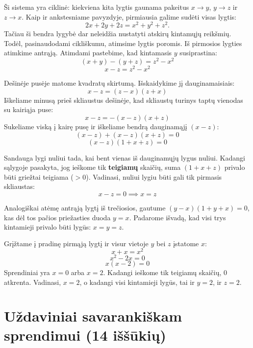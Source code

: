 \documentclass[11pt,a4paper]{scrartcl}
\begin{document}
\begin{solution}
Ši sistema yra ciklinė: kiekviena kita lygtis gaunama pakeitus $x \to y$, $y \to z$ ir $z \to x$. Kaip ir ankstesniame pavyzdyje, pirmiausia galime sudėti visas lygtis:
$$ 2x+2y+2z=x^2+y^2+z^2. $$
Tačiau ši bendra lygybė dar neleidžia nustatyti atskirų kintamųjų reikšmių. Todėl, pasinaudodami cikliškumu, atimsime lygtis poromis.
Iš pirmosios lygties atimkime antrąją. Atimdami pastebime, kad kintamasis $y$ susiprastina:
$$ (x + y) - (y + z) = z^2 - x^2 $$
$$ x - z = z^2 - x^2 $$

Dešinėje pusėje matome kvadratų skirtumą. Išskaidykime jį dauginamaisiais:
$$ x - z = (z - x)(z + x) $$
Iškeliame minusą prieš skliaustus dešinėje, kad skliaustų turinys taptų vienodas su kairiąja puse:
$$ x - z = -(x - z)(x + z) $$
Sukeliame viską į kairę pusę ir iškeliame bendrą dauginamąjį $(x - z)$:
$$ (x - z) + (x - z)(x + z) = 0 $$
$$ (x - z)(1 + x + z) = 0 $$

Sandauga lygi nuliui tada, kai bent vienas iš dauginamųjų lygus nuliui.
Kadangi sąlygoje pasakyta, jog ieškome tik \textbf{teigiamų} skaičių, suma $(1 + x + z)$ privalo būti griežtai teigiama ($>0$). Vadinasi, nuliui lygiu būti gali tik pirmasis skliaustas:
$$ x - z = 0 \implies x = z $$

Analogiškai atėmę antrąją lygtį iš trečiosios, gautume $(y - x)(1 + y + x) = 0$, kas dėl tos pačios priežasties duoda $y = x$.
Padarome išvadą, kad visi trys kintamieji privalo būti lygūs: $x = y = z$.

Grįžtame į pradinę pirmąją lygtį ir visur vietoje $y$ bei $z$ įstatome $x$:
$$ x + x = x^2 $$
$$ x^2 - 2x = 0 $$
$$ x(x - 2) = 0 $$
Sprendiniai yra $x=0$ arba $x=2$. Kadangi ieškome tik teigiamų skaičių, $0$ atkrenta. Vadinasi, $x=2$, o kadangi visi kintamieji lygūs, tai ir $y=2$, ir $z=2$.
\end{solution}


\vspace{0.5cm}

\newpage
\section{Uždaviniai savarankiškam sprendimui (14 iššūkių)}
\end{document}
